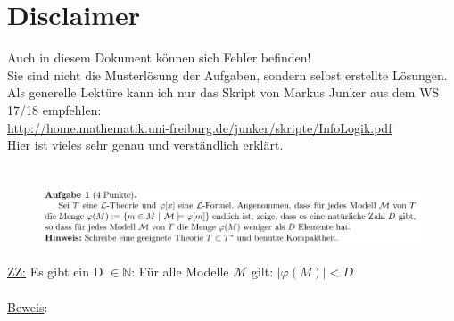 \documentclass[a4paper]{scrartcl}
\begin{document}
\section*{Disclaimer}%
\label{sec:disclaimer}
Auch in diesem Dokument können sich Fehler befinden!\\
Sie sind nicht die Musterlösung der Aufgaben, sondern selbst erstellte Lösungen.\\

Als generelle Lektüre kann ich nur das Skript von Markus Junker aus dem WS 17/18 empfehlen:\\
\url{http://home.mathematik.uni-freiburg.de/junker/skripte/InfoLogik.pdf}\\
Hier ist vieles sehr genau und verständlich erklärt.%

\section*{}%
\label{sec:aufgabe_1}

    \begin{figure}[H]
        \includegraphics[scale=0.3]{./A-1.png}
        \label{fig:}
    \end{figure}

    \underline{ZZ:} Es gibt ein D $\in \mathds{N}$: Für alle Modelle $\mathcal{M}$ gilt: $|\varphi(M)| < D$\\ 
    \\\underline{Beweis}:\\
\end{document}
